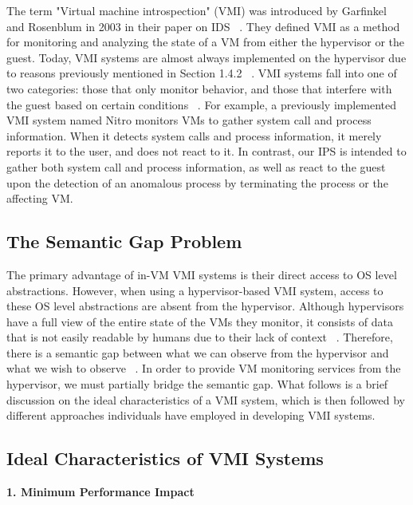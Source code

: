 \documentclass{report}
\begin{document}
\begin{spacing}{1.5}
{\large
The term "Virtual machine introspection" (VMI) was introduced by Garfinkel and Rosenblum in 2003 in their paper on IDS ~\cite{garfinkel2003virtual}. They defined VMI as a method for monitoring and analyzing the state of a VM from either the hypervisor or the guest. Today, VMI systems are almost always implemented on the hypervisor due to reasons previously mentioned in Section 1.4.2 ~\cite{bhatt2018using}. VMI systems fall into one of two categories: those that only monitor behavior, and those that interfere with the guest based on certain conditions ~\cite{nance2008virtual}. For example, a previously implemented VMI system named Nitro monitors VMs to gather system call and process information. When it detects system calls and process information, it merely reports it to the user, and does not react to it. In contrast, our IPS is intended to gather both system call and process information, as well as react to the guest upon the detection of an anomalous process by terminating the process or the affecting VM.
\newline
}


\subsection{The Semantic Gap Problem}

{\large
The primary advantage of in-VM VMI systems is their direct access to OS level abstractions. However, when using a hypervisor-based VMI system, access to these OS level abstractions are absent from the hypervisor. Although hypervisors have a full view of the entire state of the VMs they monitor, it consists of data that is not easily readable by humans due to their lack of context ~\cite{bauman2015survey}. Therefore, there is a semantic gap between what we can observe from the hypervisor and what we wish to observe ~\cite{bauman2015survey}. In order to provide VM monitoring services from the hypervisor, we must partially bridge the semantic gap. What follows is a brief discussion on the ideal characteristics of a VMI system, which is then followed by different approaches individuals have employed in developing VMI systems.
\leavevmode\newline
}


\subsection{Ideal Characteristics of VMI Systems}
\leavevmode\newline
{\large
\noindent \textbf{1. Minimum Performance Impact}
\leavevmode\newline
}


\end{spacing}
\end{document}
